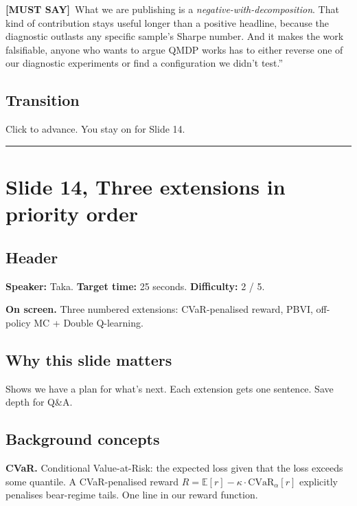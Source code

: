 \documentclass[11pt]{article}
\newcommand{\mustsay}[1]{\textcolor{must}{\textbf{[MUST SAY]}}\ #1}
\begin{document}
\mustsay{What we are publishing is a \emph{negative-with-decomposition}. That kind of contribution stays useful longer than a positive headline, because the diagnostic outlasts any specific sample's Sharpe number. And it makes the work falsifiable, anyone who wants to argue QMDP works has to either reverse one of our diagnostic experiments or find a configuration we didn't test.''}

\subsection*{Transition}

Click to advance. You stay on for Slide 14.

\bigskip\hrule

\section*{Slide 14, Three extensions in priority order}

\subsection*{Header}

\textbf{Speaker:} Taka. \quad\textbf{Target time:} 25 seconds. \quad\textbf{Difficulty:} 2 / 5.

\textbf{On screen.} Three numbered extensions: CVaR-penalised reward, PBVI, off-policy MC + Double Q-learning.

\subsection*{Why this slide matters}

Shows we have a plan for what's next. Each extension gets one sentence. Save depth for Q\&A.

\subsection*{Background concepts}

\textbf{CVaR.} Conditional Value-at-Risk: the expected loss given that the loss exceeds some quantile. A CVaR-penalised reward $R = \mathbb{E}[r] - \kappa \cdot \text{CVaR}_\alpha[r]$ explicitly penalises bear-regime tails. One line in our reward function.
\end{document}
